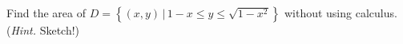 Find the area of $D = \left\{(x,y) \,|\, 1-x \le y \le \sqrt{1-x^2}\right\}$ without using calculus.  (\emph{Hint.} Sketch!)